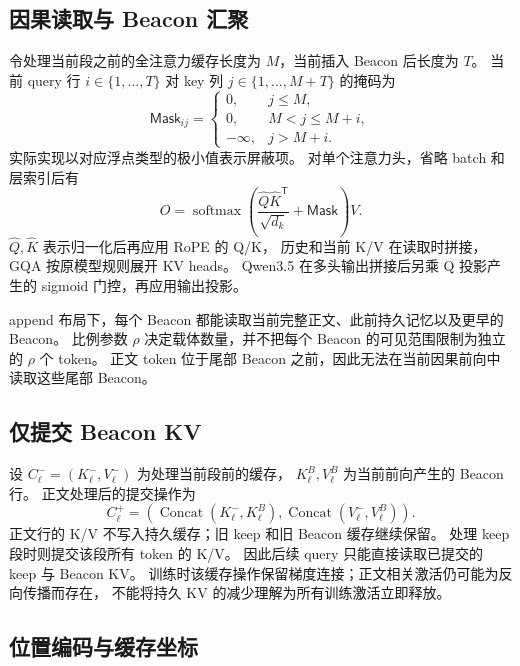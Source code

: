 \documentclass[UTF8,a4paper,11pt]{ctexart}
\newcommand{\Cat}{\operatorname{Concat}}
\begin{document}
\subsection{因果读取与 Beacon 汇聚}

令处理当前段之前的全注意力缓存长度为 $M$，当前插入 Beacon 后长度为 $T$。
当前 query 行 $i\in\{1,\ldots,T\}$ 对 key 列 $j\in\{1,\ldots,M+T\}$ 的掩码为
\begin{equation}
\mathsf{Mask}_{ij}=
\begin{cases}
0,&j\leq M,\\
0,&M<j\leq M+i,\\
-\infty,&j>M+i.
\end{cases}
\end{equation}
实际实现以对应浮点类型的极小值表示屏蔽项。
对单个注意力头，省略 batch 和层索引后有
\begin{equation}
O=\operatorname{softmax}\left(
\frac{\widehat{Q}\widehat{K}^{\mathsf T}}{\sqrt{d_k}}+\mathsf{Mask}
\right)V.
\end{equation}
$\widehat Q,\widehat K$ 表示归一化后再应用 RoPE 的 Q/K，
历史和当前 K/V 在读取时拼接，GQA 按原模型规则展开 KV heads。
Qwen3.5 在多头输出拼接后另乘 Q 投影产生的 sigmoid 门控，再应用输出投影。

append 布局下，每个 Beacon 都能读取当前完整正文、此前持久记忆以及更早的 Beacon。
比例参数 $\rho$ 决定载体数量，并不把每个 Beacon 的可见范围限制为独立的 $\rho$ 个 token。
正文 token 位于尾部 Beacon 之前，因此无法在当前因果前向中读取这些尾部 Beacon。

\subsection{仅提交 Beacon KV}

设 $C_\ell^-=(K_\ell^-,V_\ell^-)$ 为处理当前段前的缓存，
$K_\ell^B,V_\ell^B$ 为当前前向产生的 Beacon 行。
正文处理后的提交操作为
\begin{equation}\label{eq:commit}
C_\ell^+=\left(
\Cat(K_\ell^-,K_\ell^B),\Cat(V_\ell^-,V_\ell^B)
\right).
\end{equation}
正文行的 K/V 不写入持久缓存；旧 keep 和旧 Beacon 缓存继续保留。
处理 keep 段时则提交该段所有 token 的 K/V。
因此后续 query 只能直接读取已提交的 keep 与 Beacon KV。
训练时该缓存操作保留梯度连接；正文相关激活仍可能为反向传播而存在，
不能将持久 KV 的减少理解为所有训练激活立即释放。

\subsection{位置编码与缓存坐标}
\end{document}
